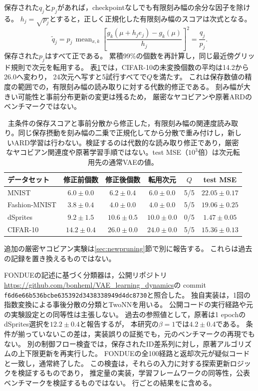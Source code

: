 \documentclass[11pt,a4paper]{ltjsarticle}
\begin{document}
保存された$q_j$と$p_j$があれば，checkpointなしでも有限刻み幅の余分な因子を除ける。
$h_j=\sqrt{p_j}$とすると，正しく正規化した有限刻み幅のスコアは次式となる。
\begin{equation}
 \widetilde q_j
 =p_j\,\operatorname{mean}_{x,k}
 \left[\frac{g_k(\mu+h_je_j)-g_k(\mu)}{h_j}\right]^2
 =\frac{q_j}{p_j}.
 \label{eq:ardcorrected}
\end{equation}
保存された$p_j$はすべて正である。
累積99\%の個数を再計算し，同じ最近傍グリッド規則で次元を転用する。
表\ref{tab:ard_normalized}では，CIFAR-10の未変換個数の平均は14.2から26.0へ変わり，
24次元へ写すと5試行すべてで$Q$を満たす。
これは保存数値の精度の範囲での，有限刻み幅の読み取りに対する代数的修正である。
刻み幅が大きい可能性と事前分布更新の変更は残るため，
厳密なヤコビアンや原著ARDのベンチマークではない。
\begin{table}[H]
\caption{主条件の保存スコアと事前分散から修正した，有限刻み幅の関連度読み取り。同じ保存摂動を刻み幅の二乗で正規化してから分散で重み付けし，新しいARD学習は行わない。検証するのは代数的な読み取り修正であり，厳密なヤコビアン関連度や原著学習手順ではない。test MSE（$10^3$倍）は次元転用先の通常VAEの値。}\label{tab:ard_normalized}
\small
\setlength{\tabcolsep}{3pt}
\begin{tabular*}{\textwidth}{@{\extracolsep{\fill}}lccccc@{}}
\toprule
データセット & 修正前個数 & 修正後個数 & 転用次元 & $Q$ & test MSE \\
\midrule
MNIST & $6.0 \pm 0.0$ & $6.2 \pm 0.4$ & $6.0 \pm 0.0$ & 5/5 & $22.05 \pm 0.17$ \\
Fashion-MNIST & $3.8 \pm 0.4$ & $4.0 \pm 0.0$ & $4.0 \pm 0.0$ & 5/5 & $19.06 \pm 0.25$ \\
dSprites & $9.2 \pm 1.5$ & $10.6 \pm 0.5$ & $10.0 \pm 0.0$ & 0/5 & $1.47 \pm 0.05$ \\
CIFAR-10 & $14.2 \pm 0.4$ & $26.0 \pm 0.0$ & $24.0 \pm 0.0$ & 5/5 & $15.36 \pm 0.13$ \\
\bottomrule\end{tabular*}
\end{table}

追加の厳密ヤコビアン実験は\ref{sec:newpruning}節で別に報告する。
これらは過去の記録を置き換えるものではない。

FONDUEの記述に基づく分類器は，公開リポジトリ
\url{https://github.com/bonheml/VAE_learning_dynamics}の
commit \texttt{f6d6e66b536bcbe635392d3438338949d4dc8730}と照合した。
独自実装は，1回の指数変換による事後分散の分類とTwoNNを用いる。
公開コードの実行経路や元の実験設定との同等性は主張しない。
過去の参照値として，原著は1 epochのdSprites選択を$12.2\pm0.4$と報告する\cite{bonheme2022fondue}が，
本研究の$\beta=1$では$4.2\pm0.4$である。
条件が揃っていないこの差は，実装誤りの証拠でも，元のベンチマークの再現でもない。
別の制御フロー検査では，保存されたID差系列に対し，原著アルゴリズムの上下限更新を再実行した。
FONDUEの全100経路と返却次元が疑似コードと一致し，通常終了した。
この検査は，それらの入力に対する探索更新ロジックを検証するものであり，
推定量の実装，学習フレームワークの同等性，公表ベンチマークを検証するものではない。
行ごとの結果をに含める。
\end{document}
